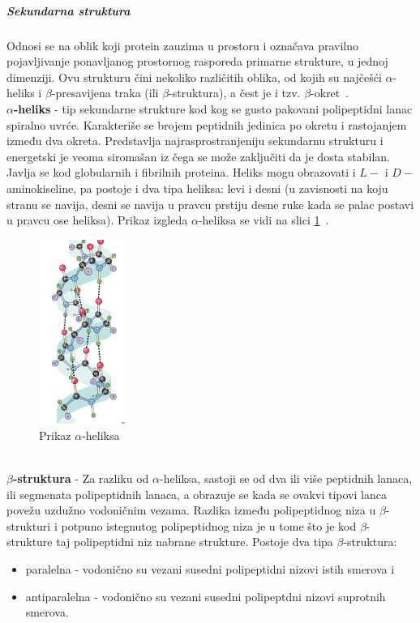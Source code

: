 \subparagraph{Sekundarna struktura}
Odnosi se na oblik koji protein zauzima u prostoru i označava pravilno pojavljivanje ponavljanog prostornog rasporeda primarne strukture, u jednoj dimenziji. Ovu strukturu čini nekoliko različitih oblika, od kojih su najčešći $\alpha$-heliks i $\beta$-presavijena traka (ili $\beta$-struktura), a čest je i tzv. $\beta$-okret~\cite{spasic,medbio}.\\
\textbf{$\alpha$-heliks} - tip sekundarne strukture kod kog se gusto pakovani polipeptidni lanac spiralno uvrće. Karakteriše se brojem peptidnih jedinica po okretu i rastojanjem između dva okreta. Predstavlja najrasprostranjeniju sekundarnu strukturu i energetski je veoma siromašan iz čega se može zaključiti da je dosta stabilan. Javlja se kod globularnih i fibrilnih proteina. Heliks mogu obrazovati i $L-$ i $D-$ aminokiseline, pa postoje i dva tipa heliksa: levi i desni (u zavisnosti na koju stranu se navija, desni se navija u pravcu prstiju desne ruke kada se palac postavi u pravcu ose heliksa). Prikaz izgleda $\alpha$-heliksa se vidi na slici \ref{fig:aheliks}~\cite{spasic, Principi}.
\begin{figure}[h]
	\centering
    \includegraphics[width=0.25\textwidth]{Figures/BO/ahelix.png}
    \caption{Prikaz $\alpha$-heliksa~\cite{bmbg}}
    \label{fig:aheliks}
\end{figure}
 \\
\textbf{$\beta$-struktura} - Za razliku od $\alpha$-heliksa, sastoji se od dva ili više peptidnih lanaca, ili segmenata polipeptidnih lanaca, a obrazuje se kada se ovakvi tipovi lanca povežu uzdužno vodoničnim vezama. Razlika između polipeptidnog niza u  $\beta$-strukturi i potpuno istegnutog polipeptidnog niza je u tome što je kod  $\beta$-strukture taj polipeptidni niz nabrane strukture. Postoje dva tipa $\beta$-struktura: 
\begin{itemize}
\item paralelna - vodonično su vezani susedni polipeptidni nizovi istih smerova  i 
\item antiparalelna - vodonično su vezani susedni polipeptdni nizovi suprotnih smerova. 
\end{itemize}
